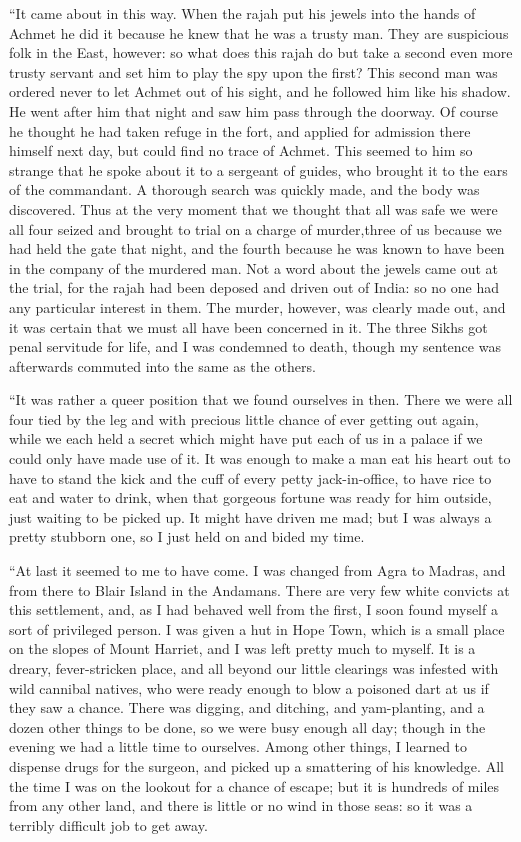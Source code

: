 \documentclass[12pt,english,oneside]{book}
\begin{document}
{}``It came about in this way. When the rajah put his jewels into
the hands of Achmet he did it because he knew that he was a trusty
man. They are suspicious folk in the East, however: so what does this
rajah do but take a second even more trusty servant and set him to
play the spy upon the first? This second man was ordered never to
let Achmet out of his sight, and he followed him like his shadow.
He went after him that night and saw him pass through the doorway.
Of course he thought he had taken refuge in the fort, and applied
for admission there himself next day, but could find no trace of Achmet.
This seemed to him so strange that he spoke about it to a sergeant
of guides, who brought it to the ears of the commandant. A thorough
search was quickly made, and the body was discovered. Thus at the
very moment that we thought that all was safe we were all four seized
and brought to trial on a charge of murder,\mdsh{---}three of us
because we had held the gate that night, and the fourth because he
was known to have been in the company of the murdered man. Not a word
about the jewels came out at the trial, for the rajah had been deposed
and driven out of India: so no one had any particular interest in
them. The murder, however, was clearly made out, and it was certain
that we must all have been concerned in it. The three Sikhs got penal
servitude for life, and I was condemned to death, though my sentence
was afterwards commuted into the same as the others.

{}``It was rather a queer position that we found ourselves in then.
There we were all four tied by the leg and with precious little chance
of ever getting out again, while we each held a secret which might
have put each of us in a palace if we could only have made use of
it. It was enough to make a man eat his heart out to have to stand
the kick and the cuff of every petty jack-in-office, to have rice
to eat and water to drink, when that gorgeous fortune was ready for
him outside, just waiting to be picked up. It might have driven me
mad; but I was always a pretty stubborn one, so I just held on and
bided my time.

{}``At last it seemed to me to have come. I was changed from Agra
to Madras, and from there to Blair Island in the Andamans. There are
very few white convicts at this settlement, and, as I had behaved
well from the first, I soon found myself a sort of privileged person.
I was given a hut in Hope Town, which is a small place on the slopes
of Mount Harriet, and I was left pretty much to myself. It is a dreary,
fever-stricken place, and all beyond our little clearings was infested
with wild cannibal natives, who were ready enough to blow a poisoned
dart at us if they saw a chance. There was digging, and ditching,
and yam-planting, and a dozen other things to be done, so we were
busy enough all day; though in the evening we had a little time to
ourselves. Among other things, I learned to dispense drugs for the
surgeon, and picked up a smattering of his knowledge. All the time
I was on the lookout for a chance of escape; but it is hundreds of
miles from any other land, and there is little or no wind in those
seas: so it was a terribly difficult job to get away.
\end{document}
